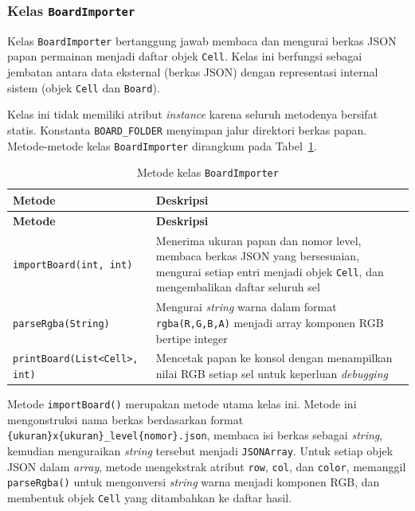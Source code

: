 \subsubsection{Kelas \texttt{BoardImporter}}
\label{subsubsec:kelas-boardimporter}

Kelas \texttt{BoardImporter} bertanggung jawab membaca dan mengurai berkas JSON papan permainan menjadi daftar objek \texttt{Cell}. Kelas ini berfungsi sebagai jembatan antara data eksternal (berkas JSON) dengan representasi internal sistem (objek \texttt{Cell} dan \texttt{Board}).

Kelas ini tidak memiliki atribut \textit{instance} karena seluruh metodenya bersifat statis. Konstanta \texttt{BOARD\_FOLDER} menyimpan jalur direktori berkas papan. Metode-metode kelas \texttt{BoardImporter} dirangkum pada Tabel~\ref{tab:method-boardimporter}.

\begin{longtable}{lp{8.5cm}}
	\caption{Metode kelas \texttt{BoardImporter}}
	\label{tab:method-boardimporter} \\
	\toprule
	\textbf{Metode} & \textbf{Deskripsi} \\
	\midrule
	\endfirsthead
	\toprule
	\textbf{Metode} & \textbf{Deskripsi} \\
	\midrule
	\endhead
	\bottomrule
	\endfoot
	\texttt{importBoard(int, int)} & Menerima ukuran papan dan nomor level, membaca berkas JSON yang bersesuaian, mengurai setiap entri menjadi objek \texttt{Cell}, dan mengembalikan daftar seluruh sel \\
	\midrule
	\texttt{parseRgba(String)} & Mengurai \textit{string} warna dalam format \texttt{rgba(R,G,B,A)} menjadi array komponen RGB bertipe integer \\
	\midrule
	\texttt{printBoard(List<Cell>, int)} & Mencetak papan ke konsol dengan menampilkan nilai RGB setiap sel untuk keperluan \textit{debugging} \\
	\bottomrule
\end{longtable}

Metode \texttt{importBoard()} merupakan metode utama kelas ini. Metode ini mengonstruksi nama berkas berdasarkan format \texttt{\{ukuran\}x\{ukuran\}\_level\{nomor\}.json}, membaca isi berkas sebagai \textit{string}, kemudian menguraikan \textit{string} tersebut menjadi \texttt{JSONArray}. Untuk setiap objek JSON dalam \textit{array}, metode mengekstrak atribut \texttt{row}, \texttt{col}, dan \texttt{color}, memanggil \texttt{parseRgba()} untuk mengonversi \textit{string} warna menjadi komponen RGB, dan membentuk objek \texttt{Cell} yang ditambahkan ke daftar hasil.

